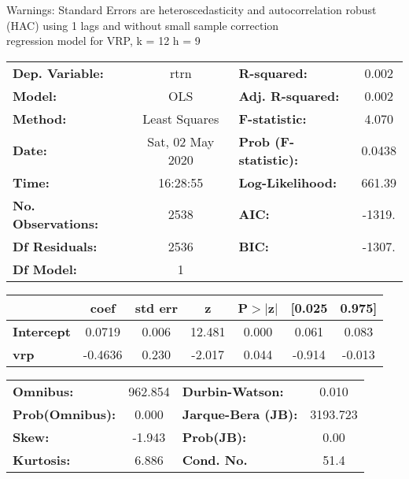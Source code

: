 Warnings: \newline
 [1] Standard Errors are heteroscedasticity and autocorrelation robust (HAC) using 1 lags and without small sample correction\\ 

regression model for VRP, k = 12 h = 9\begin{center}
\begin{tabular}{lclc}
\toprule
\textbf{Dep. Variable:}    &       rtrn       & \textbf{  R-squared:         } &     0.002   \\
\textbf{Model:}            &       OLS        & \textbf{  Adj. R-squared:    } &     0.002   \\
\textbf{Method:}           &  Least Squares   & \textbf{  F-statistic:       } &     4.070   \\
\textbf{Date:}             & Sat, 02 May 2020 & \textbf{  Prob (F-statistic):} &   0.0438    \\
\textbf{Time:}             &     16:28:55     & \textbf{  Log-Likelihood:    } &    661.39   \\
\textbf{No. Observations:} &        2538      & \textbf{  AIC:               } &    -1319.   \\
\textbf{Df Residuals:}     &        2536      & \textbf{  BIC:               } &    -1307.   \\
\textbf{Df Model:}         &           1      & \textbf{                     } &             \\
\bottomrule
\end{tabular}
\begin{tabular}{lcccccc}
                   & \textbf{coef} & \textbf{std err} & \textbf{z} & \textbf{P$> |$z$|$} & \textbf{[0.025} & \textbf{0.975]}  \\
\midrule
\textbf{Intercept} &       0.0719  &        0.006     &    12.481  &         0.000        &        0.061    &        0.083     \\
\textbf{vrp}       &      -0.4636  &        0.230     &    -2.017  &         0.044        &       -0.914    &       -0.013     \\
\bottomrule
\end{tabular}
\begin{tabular}{lclc}
\textbf{Omnibus:}       & 962.854 & \textbf{  Durbin-Watson:     } &    0.010  \\
\textbf{Prob(Omnibus):} &   0.000 & \textbf{  Jarque-Bera (JB):  } & 3193.723  \\
\textbf{Skew:}          &  -1.943 & \textbf{  Prob(JB):          } &     0.00  \\
\textbf{Kurtosis:}      &   6.886 & \textbf{  Cond. No.          } &     51.4  \\
\bottomrule
\end{tabular}
\end{center}

